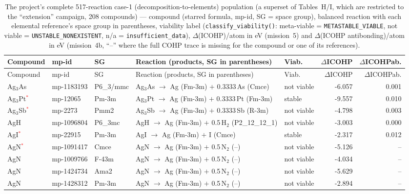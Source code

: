 \begin{longtable}{@{}ll l@{\hspace{4pt}} p{4.6cm} l@{\hspace{4pt}} rr@{}}
\caption{The project's complete 517-reaction case-1 (decomposition-to-elements) population (a superset of Tables~H/I, which are restricted to the ``extension'' campaign, 208 compounds) --- compound (starred formula, mp-id, SG = space group), balanced reaction with each elemental reference's space group in parentheses, viability label (\texttt{classify\_viability()}: meta-viable = \texttt{METASTABLE\_VIABLE}, not viable = \texttt{UNSTABLE\_NONEXISTENT}, n/a = \texttt{insufficient\_data}), $\Delta$(ICOHP)/atom in eV (mission~5) and $\Delta$(ICOHP antibonding)/atom in eV (mission~4b, ``--'' where the full COHP trace is missing for the compound or one of its references).}\\
\toprule
Compound & mp-id & SG & Reaction (products, SG in parentheses) & Viab. & $\Delta$ICOHP & $\Delta$ICOHP\-ab. \\
\midrule
\endfirsthead
\toprule
Compound & mp-id & SG & Reaction (products, SG in parentheses) & Viab. & $\Delta$ICOHP & $\Delta$ICOHP\-ab. \\
\midrule
\endhead
\bottomrule
\endfoot
\bottomrule
\endlastfoot
Ag$_{3}$As & mp-1183193 & P6\_3/mmc & Ag$_{3}$As $\to$ Ag (Fm-3m) $+$ 0.3333\,As (Cmce) & not viable & -6.057 & 0.001 \\
Ag$_{3}$Pt\textcolor{red}{$^*$} & mp-12065 & Pm-3m & Ag$_{3}$Pt $\to$ Ag (Fm-3m) $+$ 0.3333\,Pt (Fm-3m) & stable & -9.557 & 0.010 \\
Ag$_{3}$Sb\textcolor{red}{$^*$} & mp-2273 & Pmm2 & Ag$_{3}$Sb $\to$ Ag (Fm-3m) $+$ 0.3333\,Sb (R-3m) & not viable & -4.798 & 0.003 \\
AgH & mp-1096804 & P6\_3mc & AgH $\to$ Ag (Fm-3m) $+$ 0.5\,H$_{2}$ (P2\_12\_12\_1) & not viable & -3.003 & 0.000 \\
AgI\textcolor{red}{$^*$} & mp-22915 & Pm-3m & AgI $\to$ Ag (Fm-3m) $+$ I (Cmce) & stable & -2.317 & 0.012 \\
AgN\textcolor{red}{$^*$} & mp-1091417 & Cmce & AgN $\to$ Ag (Fm-3m) $+$ 0.5\,N$_{2}$ (--) & not viable & -5.126 & -- \\
AgN & mp-1009766 & F-43m & AgN $\to$ Ag (Fm-3m) $+$ 0.5\,N$_{2}$ (--) & not viable & -4.034 & -- \\
AgN & mp-1424734 & Ama2 & AgN $\to$ Ag (Fm-3m) $+$ 0.5\,N$_{2}$ (--) & not viable & -5.629 & -- \\
AgN & mp-1428312 & Pm-3m & AgN $\to$ Ag (Fm-3m) $+$ 0.5\,N$_{2}$ (--) & not viable & -2.894 & -- \\

\end{longtable}
